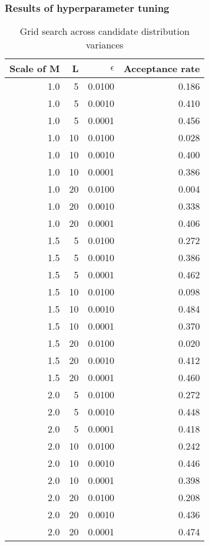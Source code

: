 \documentclass{article}
\begin{document}
\subsubsection{Results of hyperparameter tuning}
\begin{table}[H]
  \begin{center}
\begin{tabular}{rrrr}
  \textbf{Scale of M} & \textbf{L} & $\epsilon$ & \textbf{Acceptance rate}\\
  \midrule
   1.0 &  5 &   0.0100 &            0.186 \\
   1.0 &  5 &   0.0010 &            0.410 \\
   1.0 &  5 &   0.0001 &            0.456 \\
   1.0 & 10 &   0.0100 &            0.028 \\
   1.0 & 10 &   0.0010 &            0.400 \\
   1.0 & 10 &   0.0001 &            0.386 \\
   1.0 & 20 &   0.0100 &            0.004 \\
   1.0 & 20 &   0.0010 &            0.338 \\
   1.0 & 20 &   0.0001 &            0.406 \\
   1.5 &  5 &   0.0100 &            0.272 \\
   1.5 &  5 &   0.0010 &            0.386 \\
   1.5 &  5 &   0.0001 &            0.462 \\
   1.5 & 10 &   0.0100 &            0.098 \\
   1.5 & 10 &   0.0010 &            0.484 \\
   1.5 & 10 &   0.0001 &            0.370 \\
   1.5 & 20 &   0.0100 &            0.020 \\
   1.5 & 20 &   0.0010 &            0.412 \\
   1.5 & 20 &   0.0001 &            0.460 \\
   2.0 &  5 &   0.0100 &            0.272 \\
   2.0 &  5 &   0.0010 &            0.448 \\
   2.0 &  5 &   0.0001 &            0.418 \\
   2.0 & 10 &   0.0100 &            0.242 \\
   2.0 & 10 &   0.0010 &            0.446 \\
   2.0 & 10 &   0.0001 &            0.398 \\
   2.0 & 20 &   0.0100 &            0.208 \\
   2.0 & 20 &   0.0010 &            0.436 \\
   2.0 & 20 &   0.0001 &            0.474 \\
 \bottomrule
 \end{tabular}
\end{center}
 \caption{\label{tab:hmc_gridsearch} Grid search across candidate distribution variances}
\end{table}
\end{document}
